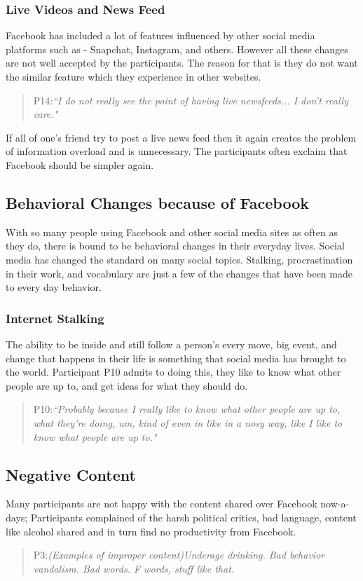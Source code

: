 \subsubsection{Live Videos and News Feed}
Facebook has included a lot of features influenced by other social media platforms such as - Snapchat, Instagram, and others. However all these changes are not well accepted by the participants. The reason for that is they do not want the similar feature which they experience in other websites. 
\begin{quote}
P14:\textit{``I do not really see the point of having live newsfeeds... I don't really care."}
\end{quote}
If all of one's friend try to post a live news feed then it again creates the problem of information overload and is unnecessary. The participants often exclaim that Facebook should be simpler again.
\subsection{Behavioral Changes because of Facebook}
With so many people using Facebook and other social media sites as often as they do, there is bound to be behavioral changes in their everyday lives. Social media has changed the standard on many social topics. Stalking, procrastination in their work, and vocabulary are just a few of the changes that have been made to every day behavior.
\subsubsection{Internet Stalking}
The ability to be inside and still follow a person's every move, big event, and change that happens in their life is something that social media has brought to the world. Participant P10 admits to doing this, they like to know what other people are up to, and get ideas for what they should do.
\begin{quote}
P10:\textit{``Probably because I really like to know what other people are up to, what they're doing, um, kind of even in like in a nosy way, like I like to know what people are up to."}
\end{quote}
\subsection{Negative Content}
Many participants are not happy with the content shared over Facebook now-a-days; Participants complained of the harsh political critics, bad language, content like alcohol shared and in turn find no productivity from Facebook.
\begin{quote}
P3:\textit{(Examples of improper content)Underage drinking. Bad behavior vandalism. Bad words. F words, stuff like that.}
\end{quote}
